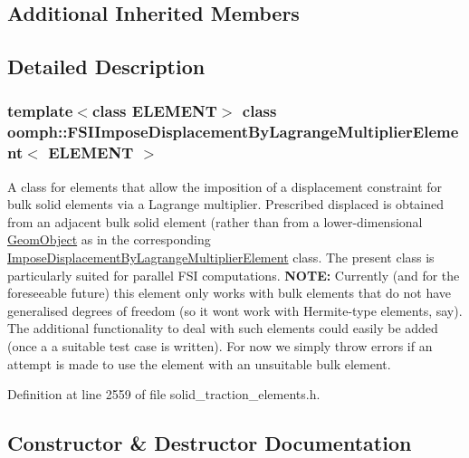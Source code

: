 \subsection*{Additional Inherited Members}


\subsection{Detailed Description}
\subsubsection*{template$<$class E\+L\+E\+M\+E\+NT$>$\newline
class oomph\+::\+F\+S\+I\+Impose\+Displacement\+By\+Lagrange\+Multiplier\+Element$<$ E\+L\+E\+M\+E\+N\+T $>$}

A class for elements that allow the imposition of a displacement constraint for bulk solid elements via a Lagrange multiplier. Prescribed displaced is obtained from an adjacent bulk solid element (rather than from a lower-\/dimensional \hyperlink{classoomph_1_1GeomObject}{Geom\+Object} as in the corresponding \hyperlink{classoomph_1_1ImposeDisplacementByLagrangeMultiplierElement}{Impose\+Displacement\+By\+Lagrange\+Multiplier\+Element} class. The present class is particularly suited for parallel F\+SI computations. {\bfseries N\+O\+TE\+:} Currently (and for the foreseeable future) this element only works with bulk elements that do not have generalised degrees of freedom (so it won\textquotesingle{}t work with Hermite-\/type elements, say). The additional functionality to deal with such elements could easily be added (once a a suitable test case is written). For now we simply throw errors if an attempt is made to use the element with an unsuitable bulk element. 

Definition at line 2559 of file solid\+\_\+traction\+\_\+elements.\+h.



\subsection{Constructor \& Destructor Documentation}
\mbox{\label{classoomph_1_1FSIImposeDisplacementByLagrangeMultiplierElement_a7044be589f6889ce01e69010a4030748}} 
